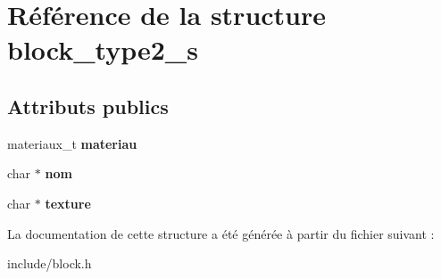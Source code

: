 \hypertarget{structblock__type2__s}{}\section{Référence de la structure block\+\_\+type2\+\_\+s}
\label{structblock__type2__s}
\subsection*{Attributs publics}
\begin{DoxyCompactItemize}
\item 
\mbox{\label{structblock__type2__s_a5a92468e8fa612d4d6b13808da3ab078}} 
materiaux\+\_\+t {\bfseries materiau}
\item 
\mbox{\label{structblock__type2__s_a8ce4e8f7967a2c24eeaaee1df7d8c86d}} 
char $\ast$ {\bfseries nom}
\item 
\mbox{\label{structblock__type2__s_afe2ae7adf235d70a8ca33856704e9c6b}} 
char $\ast$ {\bfseries texture}
\end{DoxyCompactItemize}


La documentation de cette structure a été générée à partir du fichier suivant \+:\begin{DoxyCompactItemize}
\item 
include/block.\+h\end{DoxyCompactItemize}
